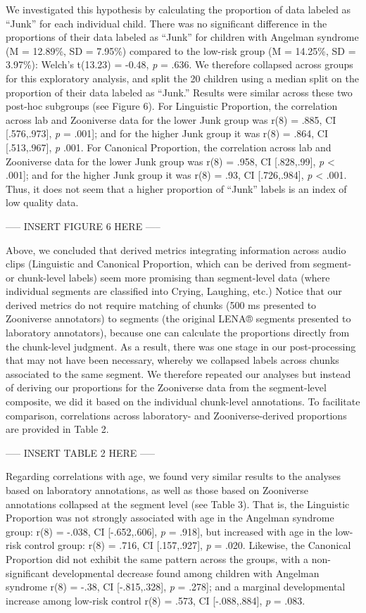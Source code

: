 \documentclass[
  english,
  ,man]{apa6}
\begin{document}
We investigated this hypothesis by calculating the proportion of data labeled as ``Junk'' for each individual child. There was no significant difference in the proportions of their data labeled as ``Junk'' for children with Angelman syndrome (M = 12.89\%, SD = 7.95\%) compared to the low-risk group (M = 14.25\%, SD = 3.97\%): Welch's t(13.23) = -0.48, \emph{p} = .636. We therefore collapsed across groups for this exploratory analysis, and split the 20 children using a median split on the proportion of their data labeled as ``Junk.'' Results were similar across these two post-hoc subgroups (see Figure 6). For Linguistic Proportion, the correlation across lab and Zooniverse data for the lower Junk group was r(8) = .885, CI {[}.576,.973{]}, \emph{p} = .001{]}; and for the higher Junk group it was r(8) = .864, CI {[}.513,.967{]}, \emph{p} .001. For Canonical Proportion, the correlation across lab and Zooniverse data for the lower Junk group was r(8) = .958, CI {[}.828,.99{]}, \emph{p} \textless{} .001{]}; and for the higher Junk group it was r(8) = .93, CI {[}.726,.984{]}, \emph{p} \textless{} .001. Thus, it does not seem that a higher proportion of ``Junk'' labels is an index of low quality data.

----- INSERT FIGURE 6 HERE -----

Above, we concluded that derived metrics integrating information across audio clips (Linguistic and Canonical Proportion, which can be derived from segment- or chunk-level labels) seem more promising than segment-level data (where individual segments are classified into Crying, Laughing, etc.) Notice that our derived metrics do not require matching of chunks (500 ms presented to Zooniverse annotators) to segments (the original LENA® segments presented to laboratory annotators), because one can calculate the proportions directly from the chunk-level judgment. As a result, there was one stage in our post-processing that may not have been necessary, whereby we collapsed labels across chunks associated to the same segment. We therefore repeated our analyses but instead of deriving our proportions for the Zooniverse data from the segment-level composite, we did it based on the individual chunk-level annotations. To facilitate comparison, correlations across laboratory- and Zooniverse-derived proportions are provided in Table 2.

----- INSERT TABLE 2 HERE -----

Regarding correlations with age, we found very similar results to the analyses based on laboratory annotations, as well as those based on Zooniverse annotations collapsed at the segment level (see Table 3). That is, the Linguistic Proportion was not strongly associated with age in the Angelman syndrome group: r(8) = -.038, CI {[}-.652,.606{]}, \emph{p} = .918{]}, but increased with age in the low-risk control group: r(8) = .716, CI {[}.157,.927{]}, \emph{p} = .020. Likewise, the Canonical Proportion did not exhibit the same pattern across the groups, with a non-significant developmental decrease found among children with Angelman syndrome r(8) = -.38, CI {[}-.815,.328{]}, \emph{p} = .278{]}; and a marginal developmental increase among low-risk control r(8) = .573, CI {[}-.088,.884{]}, \emph{p} = .083.
\end{document}
